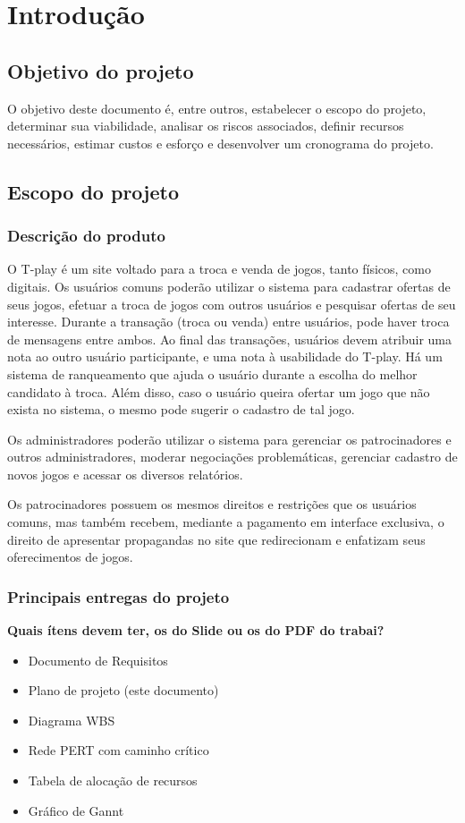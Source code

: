 \documentclass[a4paper,11pt]{article}
\newcommand{\DUVIDA}[1]{\huge \textbf {\color{red} #1}\normalsize\\} %
\begin{document}
\tableofcontents
\newpage

\section{Introdução}
	\subsection{Objetivo do projeto}
		O objetivo deste documento é, entre outros, estabelecer o escopo do projeto, determinar sua viabilidade, analisar os riscos associados, definir recursos necessários, estimar custos e esforço e desenvolver um cronograma do projeto.

	\subsection{Escopo do projeto}
		\subsubsection{Descrição do produto}
			O T-play é  um site voltado para a troca e venda de jogos, tanto físicos, como digitais.
			Os usuários comuns poderão utilizar o sistema para cadastrar ofertas de seus jogos, efetuar a troca de jogos com outros usuários e 
pesquisar ofertas de seu interesse.
			Durante a transação (troca ou venda) entre usuários, pode haver troca de mensagens entre ambos.
			Ao final das transações, usuários devem atribuir uma nota ao outro usuário participante, e uma nota à usabilidade do T-play.
			Há um sistema de ranqueamento que ajuda o usuário durante a escolha do melhor candidato à troca.
			Além disso, caso o usuário queira ofertar um jogo que não exista no sistema, o mesmo pode sugerir o cadastro de tal jogo.
			
			Os administradores poderão utilizar o sistema para gerenciar os patrocinadores e outros administradores, moderar negociações problemáticas, gerenciar cadastro de novos jogos e acessar os diversos relatórios.

			Os patrocinadores possuem os mesmos direitos e restrições que os usuários comuns, mas também recebem, mediante a pagamento em interface exclusiva, o direito de apresentar propagandas no site que redirecionam e enfatizam seus oferecimentos de jogos.

		\subsubsection{Principais entregas do projeto}
			\DUVIDA{Quais ítens devem ter, os do Slide ou os do PDF do trabai?}
			\begin{itemize}
				\item Documento de Requisitos
				\item Plano de projeto (este documento)
				\item Diagrama WBS
				\item Rede PERT com caminho crítico
				\item Tabela de alocação de recursos
				\item Gráfico de Gannt
			\end{itemize}
\end{document}
